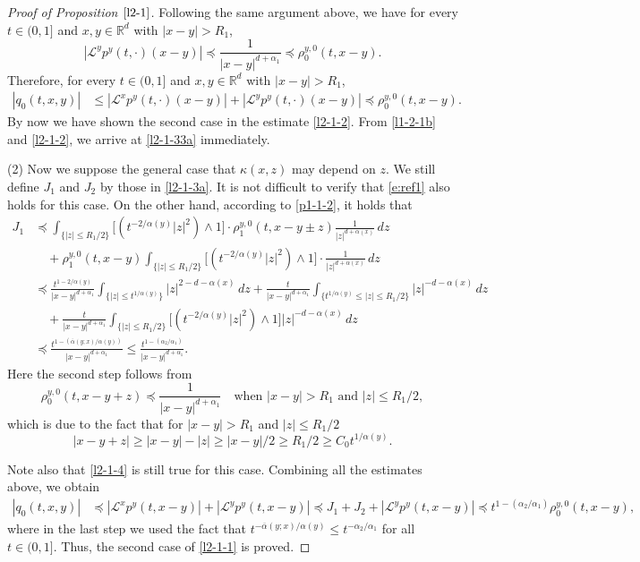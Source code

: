 \documentclass[a4paper,11pt]{amsart}
\renewcommand{\le}{\leqslant}
\renewcommand{\ge}{\geqslant}
\newcommand{\R}{\mathds R}
\newcommand{\p}{\preceq}
\newcommand{\K}{\kappa}
\newcommand{\A}{\alpha}
\def\LL{{\mathcal L}}
\theoremstyle{definition}
\begin{document}
\begin{proof}[Proof of Proposition $\ref{l2-1}$]
Following the same argument above, we have for every $t\in (0,1]$ and $x,y\in\R^d$ with $|x-y|>R_1$,
\begin{equation}\label{l2-1-4}
| \LL^y p^y(t,\cdot)(x-y)|\p \frac{1}{|x-y|^{d+\A_1}}\p \rho^{y,0}_0(t,x-y).\end{equation}
Therefore, for every $t\in (0,1]$ and $x,y\in\R^d$ with $|x-y|>R_1$,
\begin{align*}
|q_0(t,x,y)|&\le | \LL^x p^y(t,\cdot)(x-y)|+| \LL^y p^y(t,\cdot)(x-y)|\p
\rho^{y,0}_0(t,x-y).
\end{align*}
By now we have shown the second case in the estimate \eqref{l2-1-2}.
From \eqref{l1-2-1b} and \eqref{l2-1-2}, we arrive at
\eqref{l2-1-33a} immediately.

(2) Now we suppose the general case that $\K(x,z)$ may depend on $z$. We still define $J_1$ and $J_2$ by those in \eqref{l2-1-3a}. It is not
difficult to verify that \eqref{e:ref1} also holds for this case.
On the other hand, according to \eqref{p1-1-2}, it holds that
\begin{equation}\label{l2-1-5}
\begin{split}
J_1&\p \int_{\{|z|\le {R_1}/{2}\}}\big[(t^{-{2}/{\A(y)}}|z|^2)\wedge 1\big]\cdot\rho^{y,0}_1(t,x-y\pm z)\frac{1}{|z|^{d+\A(x)}}\,dz\\
&\quad +\rho_1^{y,0}(t,x-y)\int_{\{|z|\le {R_1}/{2}\}}\big[(t^{-{2}/{\A(y)}}|z|^2)\wedge 1\big]\cdot\frac{1}{|z|^{d+\A(x)}}\,dz\\
&\p\frac{t^{1-{2}/{\A(y)}}}{|x-y|^{d+\A_1}}\int_{\{|z|\le
t^{{1/\A(y)}}\}}|z|^{2-d-\A(x)}\,dz  +
\frac{t}{|x-y|^{d+\A_1}}\int_{\{t^{{1/\A(y)}}\le |z|\le {R_1}/{2}\}}|z|^{-d-\A(x)}\,dz\\
&\quad + \frac{t}{|x-y|^{d+\A_1}}
\int_{\{|z|\le {R_1}/{2}\}}\big[(t^{-{2}/{\A(y)}}|z|^2)\wedge 1\big]|z|^{-d-\A(x)}\,dz\\
&\p \frac{t^{1-({\overline{\alpha}(y;x)}/{\alpha(y)})}}{|x-y|^{d+\alpha_1}}\le  \frac{t^{1-(\A_2/\A_1)}}{|x-y|^{d+\alpha_1}}.
\end{split}
\end{equation}
Here the second step follows from
\begin{equation*}
\rho^{y,0}_0(t,x-y+ z)\p \frac{1}{|x-y|^{d+\A_1}}\quad\textrm{
when } |x-y|> R_1\textrm{ and }|z|\le {R_1}/{2},
\end{equation*}
which is due to the fact that for $ |x-y|> R_1$ and $ |z|\le {R_1}/{2}$
$$|x-y+ z| \ge |x-y|-|z|\ge  {|x-y|}/{2}\ge
{R_1}/{2}\ge C_0t^{{1/\A(y)}}.$$

Note also that \eqref{l2-1-4} is still true for this case. Combining all the estimates above, we obtain
\begin{align*}
|q_0(t,x,y)|&\p
| \LL^x p^y(t,x-y)|+| \LL^y p^y(t,x-y)| \p J_1+J_2+| \LL^yp^y(t,x-y)|\p t^{1-({\A_2}/{\A_1})}\rho_0^{y,0}(t,x-y),
\end{align*}
where in the last step we used the fact that $t^{-{\overline{\A}(y;x)}/{\A(y)}}\le t^{-{\A_2}/{\A_1}}$ for all $t \in (0,1].$
Thus, the second case of \eqref{l2-1-1} is proved.
\end{proof}
\end{document}
